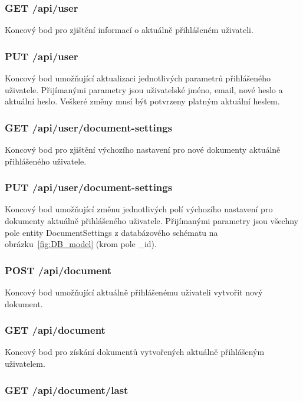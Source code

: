 \subsubsection{GET /api/user}

Koncový bod pro zjištění informací o aktuálně přihlášeném uživateli.

\subsubsection{PUT /api/user}

Koncový bod umožňující aktualizaci jednotlivých parametrů přihlášeného uživatele.
Přijímanými parametry jsou uživatelské jméno, email, nové heslo a aktuální heslo.
Veškeré změny musí být potvrzeny platným aktuální heslem.

\subsubsection{GET /api/user/document-settings}

Koncový bod pro zjištění výchozího nastavení pro nové dokumenty aktuálně přihlášeného uživatele.

\subsubsection{PUT /api/user/document-settings}

Koncový bod umožňující změnu jednotlivých polí výchozího nastavení pro dokumenty aktuálně přihlášeného uživatele.
Přijímanými parametry jsou všechny pole entity DocumentSettings z databázového schématu na obrázku~\ref{fig:DB_model} (krom pole \_id).

\subsubsection{POST /api/document}

Koncový bod umožňující aktuálně přihlášenému uživateli vytvořit nový dokument.

\subsubsection{GET /api/document}

Koncový bod pro získání dokumentů vytvořených aktuálně přihlášeným uživatelem.

\subsubsection{GET /api/document/last}

